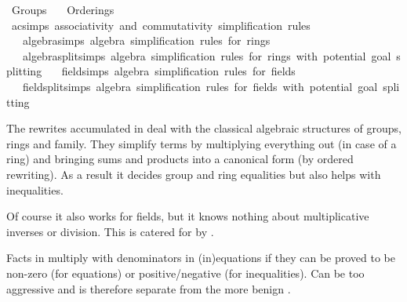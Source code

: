 %
\begin{isabellebody}%
%
%
\isadelimdocument
%
\endisadelimdocument
%
\isatagdocument
%
\isamarkuptrue%
%
\endisatagdocument
{\isafolddocument}%
%
\isadelimdocument
%
\endisadelimdocument
%
\isadelimtheory
%
\endisadelimtheory
%
\isatagtheory
{}\isamarkupfalse%
\ Groups\isanewline
\ \ \ Orderings\isanewline
{}%
\endisatagtheory
{\isafoldtheory}%
%
\isadelimtheory
%
\endisadelimtheory
%
\isadelimdocument
%
\endisadelimdocument
%
\isatagdocument
%
\isamarkuptrue%
%
\endisatagdocument
{\isafolddocument}%
%
\isadelimdocument
%
\endisadelimdocument
{}\isamarkupfalse%
\ ac{\isacharunderscore}{\kern0pt}simps\ {\isachardoublequoteopen}associativity\ and\ commutativity\ simplification\ rules{\isachardoublequoteclose}\isanewline
\ \ \ algebra{\isacharunderscore}{\kern0pt}simps\ {\isachardoublequoteopen}algebra\ simplification\ rules\ for\ rings{\isachardoublequoteclose}\isanewline
\ \ \ algebra{\isacharunderscore}{\kern0pt}split{\isacharunderscore}{\kern0pt}simps\ {\isachardoublequoteopen}algebra\ simplification\ rules\ for\ rings{\isacharcomma}{\kern0pt}\ with\ potential\ goal\ splitting{\isachardoublequoteclose}\isanewline
\ \ \ field{\isacharunderscore}{\kern0pt}simps\ {\isachardoublequoteopen}algebra\ simplification\ rules\ for\ fields{\isachardoublequoteclose}\isanewline
\ \ \ field{\isacharunderscore}{\kern0pt}split{\isacharunderscore}{\kern0pt}simps\ {\isachardoublequoteopen}algebra\ simplification\ rules\ for\ fields{\isacharcomma}{\kern0pt}\ with\ potential\ goal\ splitting{\isachardoublequoteclose}%
\begin{isamarkuptext}%
The rewrites accumulated in  deal with the classical
  algebraic structures of groups, rings and family. They simplify terms by
  multiplying everything out (in case of a ring) and bringing sums and
  products into a canonical form (by ordered rewriting). As a result it
  decides group and ring equalities but also helps with inequalities.

  Of course it also works for fields, but it knows nothing about
  multiplicative inverses or division. This is catered for by .

  Facts in  multiply with denominators in (in)equations if they
  can be proved to be non-zero (for equations) or positive/negative (for
  inequalities). Can be too aggressive and is therefore separate from the more
  benign .


\end{isamarkuptext}
\end{isabellebody}
